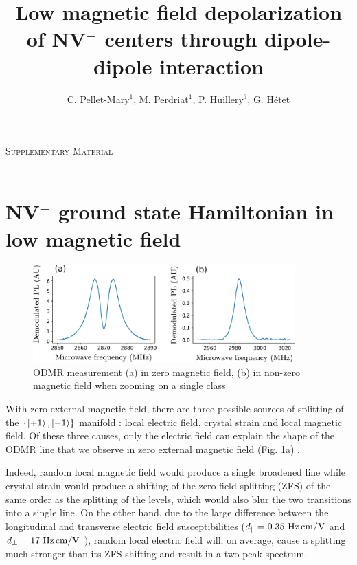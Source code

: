 \documentclass[preprintnumbers,amsmath,amssymb,onecolumn,12pt]{revtex4-2}\usepackage{graphicx}%
\begin{document}
\vspace{0.2in}
{\Large \hspace{1.6in}\textsc{Supplementary Material} }\\
\
\title{Low magnetic field depolarization of NV$^-$ centers through dipole-dipole interaction}

\author{C. Pellet-Mary$^1$, M. Perdriat$^1$, P. Huillery$^?$,  G. H\'etet} 


\maketitle

\tableofcontents

\section{NV$^-$ ground state Hamiltonian in low magnetic field}
\label{sec Hamiltonian}
\begin{figure}
\includegraphics[width=0.9\textwidth]{Figures_SI/fig_ESR}
\caption{ODMR measurement (a) in zero magnetic field, (b) in non-zero magnetic field when zooming on a single class}
\label{ESR_single_spin}
\end{figure}
With zero external magnetic field, there are three possible sources of splitting of the $\{\ket{+1},\ket{-1}\}$ manifold : local electric field, crystal strain and local magnetic field. Of these three causes, only the electric field can explain the shape of the ODMR line that we observe in zero external magnetic field (Fig. \ref{ESR_single_spin}a) \cite{mittiga2018imaging}.

Indeed, random local magnetic field would produce a single broadened line while crystal strain would produce a shifting of the zero field splitting (ZFS) of the same order as the splitting of the levels, which would also blur the two transitions into a single line. On the other hand, due to the large difference between the longitudinal and transverse electric field susceptibilities ($d_\parallel = 0.35\ \rm Hz\, cm/V$ and $d_\perp = 17\ \rm Hz\, cm/V$ \cite{van1990electric}), random local electric field will, on average, cause a splitting much stronger than its ZFS shifting and result in a two peak spectrum.
\end{document}
